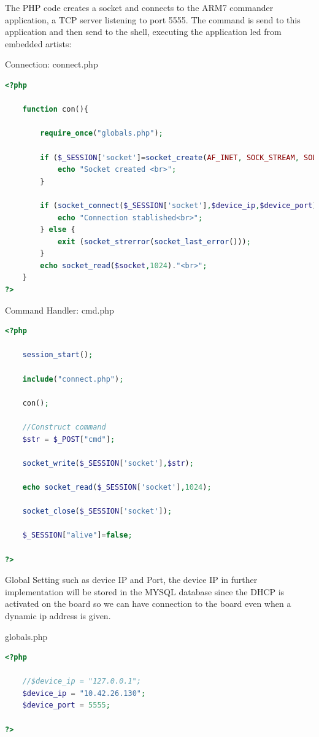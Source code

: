 The PHP code creates a socket and connects to the ARM7 commander application, a TCP server listening to port 5555. The command is send to this application and then send to the shell, executing the application led from embedded artists:

Connection: connect.php

\begin{lstlisting}[language=php]
<?php
	
	function con(){
	
		require_once("globals.php");
		
		if ($_SESSION['socket']=socket_create(AF_INET, SOCK_STREAM, SOL_TCP)){
			echo "Socket created <br>";
		}
	
		if (socket_connect($_SESSION['socket'],$device_ip,$device_port)){
			echo "Connection stablished<br>";	
		} else {
			exit (socket_strerror(socket_last_error()));
		}
		echo socket_read($socket,1024)."<br>";	
	}    
?>
\end{lstlisting}

Command Handler: cmd.php

\begin{lstlisting}[language=php]
<?php
	
	session_start();
	
	include("connect.php");
	
	con();
		
	//Construct command
	$str = $_POST["cmd"];
	
	socket_write($_SESSION['socket'],$str);
	
	echo socket_read($_SESSION['socket'],1024);
	
	socket_close($_SESSION['socket']);
	
	$_SESSION["alive"]=false;

?>
\end{lstlisting}

Global Setting such as device IP and Port, the device IP in further implementation will be stored in the MYSQL database since the DHCP is activated on the board so we can have connection to the board even when a dynamic ip address is given.

globals.php

\begin{lstlisting}[language=php]
<?php
	
	//$device_ip = "127.0.0.1";
	$device_ip = "10.42.26.130";
	$device_port = 5555;
	
?>
\end{lstlisting}

